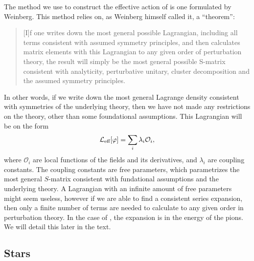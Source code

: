 The method we use to construct the effective action of \chpt is one formulated by Weinberg.
This method relies on, as Weinberg himself called it, a ``theorem'':
\begin{quote}
    [I]f one writes down the most general possible Lagrangian, including all terms consistent with assumed symmetry principles, and then calculates matrix elements with this Lagrangian to any given order of perturbation theory, the result will simply be the most general possible S-matrix consistent with analyticity, perturbative unitary, cluster decomposition and the assumed symmetry principles. \cite{WeinbergPhenom}
\end{quote}
In other words, if we write down the most general Lagrange density consistent with symmetries of the underlying theory, then we have not made any restrictions on the theory, other than some foundational assumptions.
This Lagrangian will be on the form
\begin{equation}
    \mathcal{L}_\text{eff}[\varphi] = \sum_i \lambda_i \mathcal O_i,
\end{equation}
where $\mathcal O_i$ are local functions of the fields and its derivatives, and $\lambda_i$ are coupling constants.
The coupling constants are free parameters, which parametrizes the most general $S$-matrix consistent with fundational assumptions and the underlying theory.
A Lagrangian with an infinite amount of free parameters might seem useless, however if we are able to find a consistent series expansion, then only a finite number of terms are needed to calculate to any given order in perturbation theory.
In the case of \chpt, the expansion is in the energy of the pions.
We will detail this later in the text.


\subsection*{Stars}

